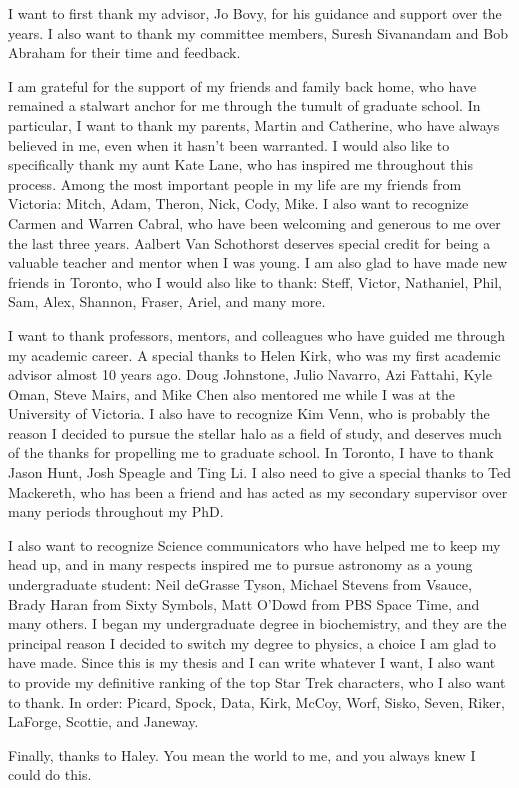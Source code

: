 \begin{acknowledgements}
    I want to first thank my advisor, Jo Bovy, for his guidance and support over the years. I also want to thank my committee members, Suresh Sivanandam and Bob Abraham for their time and feedback.
    
    I am grateful for the support of my friends and family back home, who have remained a stalwart anchor for me through the tumult of graduate school. In particular, I want to thank my parents, Martin and Catherine, who have always believed in me, even when it hasn't been warranted. I would also like to specifically thank my aunt Kate Lane, who has inspired me throughout this process. Among the most important people in my life are my friends from Victoria: Mitch, Adam, Theron, Nick, Cody, Mike. I also want to recognize Carmen and Warren Cabral, who have been welcoming and generous to me over the last three years. Aalbert Van Schothorst deserves special credit for being a valuable teacher and mentor when I was young. I am also glad to have made new friends in Toronto, who I would also like to thank: Steff, Victor, Nathaniel, Phil, Sam, Alex, Shannon, Fraser, Ariel, and many more.
    
    I want to thank professors, mentors, and colleagues who have guided me through my academic career. A special thanks to Helen Kirk, who was my first academic advisor almost 10 years ago. Doug Johnstone, Julio Navarro, Azi Fattahi, Kyle Oman, Steve Mairs, and Mike Chen also mentored me while I was at the University of Victoria. I also have to recognize Kim Venn, who is probably the reason I decided to pursue the stellar halo as a field of study, and deserves much of the thanks for propelling me to graduate school. In Toronto, I have to thank Jason Hunt, Josh Speagle and Ting Li. I also need to give a special thanks to Ted Mackereth, who has been a friend and has acted as my secondary supervisor over many periods throughout my PhD.
    
    I also want to recognize Science communicators who have helped me to keep my head up, and in many respects inspired me to pursue astronomy as a young undergraduate student: Neil deGrasse Tyson, Michael Stevens from Vsauce, Brady Haran from Sixty Symbols, Matt O'Dowd from PBS Space Time, and many others. I began my undergraduate degree in biochemistry, and they are the principal reason I decided to switch my degree to physics, a choice I am glad to have made. Since this is my thesis and I can write whatever I want, I also want to provide my definitive ranking of the top Star Trek characters, who I also want to thank. In order: Picard, Spock, Data, Kirk, McCoy, Worf, Sisko, Seven, Riker, LaForge, Scottie, and Janeway.

    Finally, thanks to Haley. You mean the world to me, and you always knew I could do this.

\end{acknowledgements}